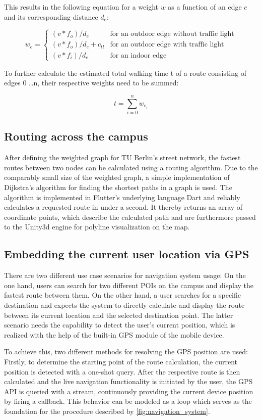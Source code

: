 This results in the following equation for a weight $w$ as a function of an edge $e$ and its corresponding distance $d_{e}$:

\[
	w_{e}=\left\{
	\begin{array}{ll}
		(v * f_{o}) / d_{e} 			& \mbox{for an outdoor edge without traffic light} 	\\
		(v * f_{o}) / d_{e} + c_{tl} 	& \mbox{for an outdoor edge with traffic light} 	\\
		(v * f_{i}) / d_{e} 			& \mbox{for an indoor edge}
	\end{array}\right.
 \]

To further calculate the estimated total walking time t of a route consisting of edges 0 \ldots n, their respective weights need to be summed:

\[
	t = \sum_{i=0}^{n} w_{e_{i}}
\]

\subsection{Routing across the campus}
After defining the weighted graph for TU Berlin's street network, the fastest routes between two nodes can be calculated using a routing algorithm. Due to the comparably small size of the weighted graph, a simple implementation of Dijkstra's algorithm for finding the shortest paths in a graph \cite{dijkstras_algorithm} is used. The algorithm is implemented in Flutter's underlying language Dart and reliably calculates a requested route in under a second. It thereby returns an array of coordinate points, which describe the calculated path and are furthermore passed to the Unity3d engine for polyline visualization on the map.

\subsection{Embedding the current user location via GPS}
There are two different use case scenarios for navigation system usage: On the one hand, users can search for two different POIs on the campus and display the fastest route between them. On the other hand, a user searches for a specific destination and expects the system to directly calculate and display the route between its current location and the selected destination point. The latter scenario needs the capability to detect the user's current position, which is realized with the help of the built-in GPS module of the mobile device.

To achieve this, two different methods for resolving the GPS position are used: Firstly, to determine the starting point of the route calculation, the current position is detected with a one-shot query. After the respective route is then calculated and the live navigation functionality is initiated by the user, the GPS API is queried with a stream, continuously providing the current device position by firing a callback. This behavior can be modeled as a loop which serves as the foundation for the procedure described by \ref{fig:navigation_system}.

